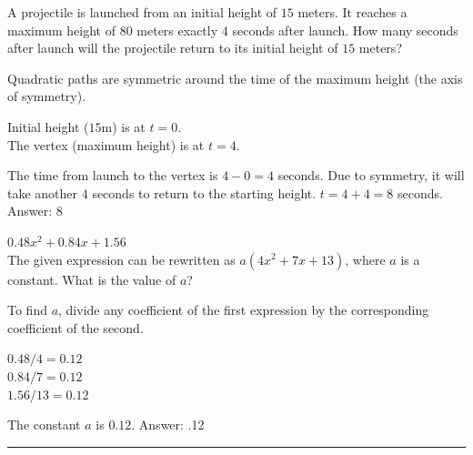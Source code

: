 \documentclass[11pt,paper=a4,answers]{exam}
\begin{document}
\begin{questions}
\vspace{1cm}

\question
A projectile is launched from an initial height of $15$ meters. It reaches a maximum height of $80$ meters exactly $4$ seconds after launch. How many seconds after launch will the projectile return to its initial height of $15$ meters?
\begin{center}
\end{center}

\begin{solution}
Quadratic paths are symmetric around the time of the maximum height (the axis of symmetry).
\vspace{5pt}
\begin{center}
Initial height ($15$m) is at $t = 0$. \\
The vertex (maximum height) is at $t = 4$.
\end{center}
\vspace{5pt}
The time from launch to the vertex is $4 - 0 = 4$ seconds. Due to symmetry, it will take another $4$ seconds to return to the starting height.
\vspace{5pt}
$t = 4 + 4 = 8$ seconds.
\vspace{5pt}
Answer: \colorbox{yellow!100}{8}
\end{solution}

\vspace{1cm}

\question
$0.48x^2 + 0.84x + 1.56$ \\
The given expression can be rewritten as $a(4x^2 + 7x + 13)$, where $a$ is a constant. What is the value of $a$?

\begin{solution}
To find $a$, divide any coefficient of the first expression by the corresponding coefficient of the second.
\vspace{5pt}
\begin{center}
$0.48 / 4 = 0.12$ \\
$0.84 / 7 = 0.12$ \\
$1.56 / 13 = 0.12$
\end{center}
\vspace{5pt}
The constant $a$ is $0.12$.
\vspace{5pt}
Answer: \colorbox{yellow!100}{.12}
\end{solution}


\end{questions}
\begin{center}
\rule{.5\textwidth}{1pt}
\end{center}
\end{document}
